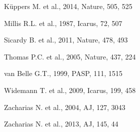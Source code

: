 \documentclass[useAMS,usenatbib]{mn2e}
\begin{document}
\begin{thebibliography}{99}
 K\"{u}ppers M. et al., 2014,
Nature, 505, 525

 Millis R.L. et al., 1987,
Icarus, 72, 507


 Sicardy B. et al., 2011,
Nature, 478, 493

 Thomas P.C. et al., 2005,
Nature, 437, 224

 van Belle G.T., 1999,
PASP, 111, 1515

 Widemann T. et al., 2009,
Icarus, 199, 458

 Zacharias N. et al., 2004,
AJ, 127, 3043

 Zacharias N. et al., 2013,
AJ, 145, 44


















\end{thebibliography}
\end{document}
